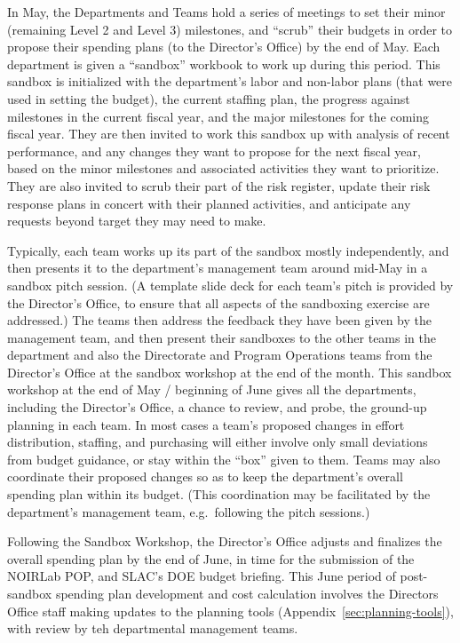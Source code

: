 \begin{itemize}
In May, the Departments and Teams hold a series of meetings to set their minor (remaining Level 2 and Level 3) milestones, and ``scrub'' their budgets in order to propose their spending plans (to the Director's Office) by the end of May.
Each department is given a ``sandbox'' workbook to work up during this period.
This sandbox is initialized with the department's labor and non-labor plans (that were used in setting the budget), the current staffing plan, the progress against milestones in the current fiscal year, and the major milestones for the coming fiscal year.
They are then invited to work this sandbox up with analysis of recent performance, and any changes they want to propose for the next fiscal year, based on the minor milestones and associated activities they want to prioritize.
They are also invited to scrub their part of the risk register, update their risk response plans in concert with their planned activities, and anticipate any requests beyond target they may need to make.

Typically, each team works up its part of the sandbox mostly independently, and then presents it to the department's management team around mid-May in a sandbox pitch session.
(A template slide deck for each team's pitch is provided by the Director's Office, to ensure that all aspects of the sandboxing exercise are addressed.)
The teams then address the feedback they have been given by the management team, and then present their sandboxes to the other teams in the department and also the Directorate and Program Operations teams from the Director's Office at the sandbox workshop at the end of the month.
This sandbox workshop at the end of May / beginning of June gives all the departments, including the Director's Office, a chance to review, and probe, the ground-up planning in each team.
In most cases a team's proposed changes in effort distribution, staffing, and purchasing will either involve only small deviations from budget guidance, or stay within the ``box'' given to them.
Teams may also coordinate their proposed changes so as to keep the department's overall spending plan within its budget.
(This coordination may be facilitated by the department's management team, e.g.\ following the pitch sessions.)

Following the Sandbox Workshop, the Director's Office adjusts and finalizes the overall spending plan by the end of June, in time for the submission of the NOIRLab POP, and SLAC's DOE budget briefing.
This June period of post-sandbox spending plan development and cost calculation involves the Directors Office staff making updates to the planning tools (Appendix~\ref{sec:planning-tools}), with review by teh departmental management teams.


\end{itemize}

